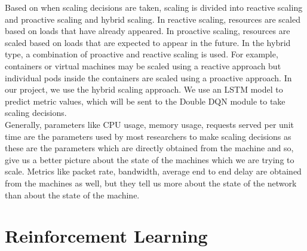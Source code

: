 \documentclass[conference]{IEEEtran}
\begin{document}
Based on when scaling decisions are taken, scaling is divided into reactive scaling and proactive scaling and hybrid scaling. In reactive scaling, resources are scaled based on loads that have already appeared. In proactive scaling, resources are scaled based on loads that are expected to appear in the future. In the hybrid type, a combination of proactive and reactive scaling is used. For example, containers or virtual machines may be scaled using a reactive approach but individual pods inside the containers are scaled using a proactive approach. In our project, we use the hybrid scaling approach. We use an LSTM model to predict metric values, which will be sent to the Double DQN module to take scaling decisions.  
\\

Generally, parameters like CPU usage, memory usage, requests served per unit time are the parameters used by most researchers to make scaling decisions as these are the parameters which are directly obtained from the machine and so, give us a better picture about the state of the machines which we are trying to scale. Metrics like packet rate, bandwidth, average end to end delay are obtained from the machines as well, but they tell us more about the state of the network than about the state of the machine. 
\\

\section{Reinforcement Learning}


\end{document}
